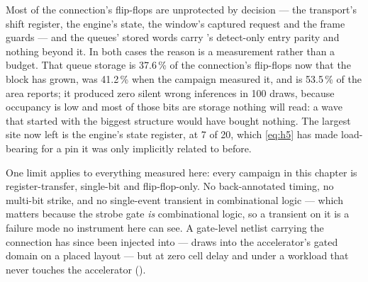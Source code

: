 Most of the connection's flip-flops are unprotected by decision --- the
transport's shift register, the engine's state, the window's captured
request and the frame guards --- and the queues' stored words carry
's detect-only entry parity and nothing beyond it. In
both cases the reason is a measurement rather than a budget. That queue
storage is 37.6\,\% of the connection's flip-flops now that the block
has grown, was 41.2\,\% when the campaign measured it, and is 53.5\,\%
of the area  reports; it produced zero silent
wrong inferences in 100 draws, because occupancy is low and most of
those bits are storage nothing will read: a wave that started with the
biggest structure would have bought nothing. The largest site now left
is the engine's state register, at 7 of 20, which
\cref{eq:h5} has made load-bearing for a pin it was only implicitly
related to before.

One limit applies to everything measured here: every campaign in this
chapter is register-transfer, single-bit and flip-flop-only. No
back-annotated timing, no multi-bit strike, and no single-event
transient in combinational logic \cite{shivakumar2002} --- which matters because the strobe
gate \emph{is} combinational logic, so a transient on it is a failure
mode no instrument here can see. A gate-level netlist carrying the
connection has since been injected into ---  draws into the
accelerator's gated domain on a placed layout --- but at zero cell
delay and under a workload that never touches the accelerator
().
